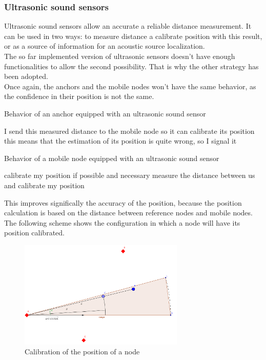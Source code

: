 \documentclass[a4paper,10pt]{article}
\begin{document}
\subsubsection{Ultrasonic sound sensors}
Ultrasonic sound sensors allow an accurate a reliable distance measurement. It can be used in two ways: to measure distance a calibrate position with 
this result, or as a source of information for an acoustic source localization.\\
The so far implemented version of ultrasonic sensors doesn't have enough functionalities to allow the second possibility. That is why the other strategy has 
been adopted.\\
Once again, the anchors and the mobile nodes won't have the same behavior, as the confidence in their position is not the same.
\begin{algorithm}[H]
\caption{Behavior of an anchor equipped with an ultrasonic sound sensor}
\begin{algorithmic}[H]
\STATE I send this measured distance to the mobile node so it can calibrate its position
\ELSE
\STATE this means that the estimation of its position is quite wrong, so I signal it
\ENDIF
\ENDIF
\ENDIF
\end{algorithmic}
\end{algorithm}
\begin{algorithm}[H]
\caption{Behavior of a mobile node equipped with an ultrasonic sound sensor}
\begin{algorithmic}[H]
\STATE calibrate my position if possible and necessary
\ELSE
{}
\STATE measure the distance between us and calibrate my position
\ENDIF
\ENDIF
\end{algorithmic}
\end{algorithm}
\noindent
This improves significally the accuracy of the position, because the position calculation is based on the distance between reference nodes and 
mobile nodes.
\\
The following scheme shows the configuration in which a node will have its position calibrated.
\begin{figure}[H]
  \centering
 \includegraphics[width=0.7\textwidth]{triangle_us2.png}
  \caption{Calibration of the position of a node}
\end{figure}
\end{document}
